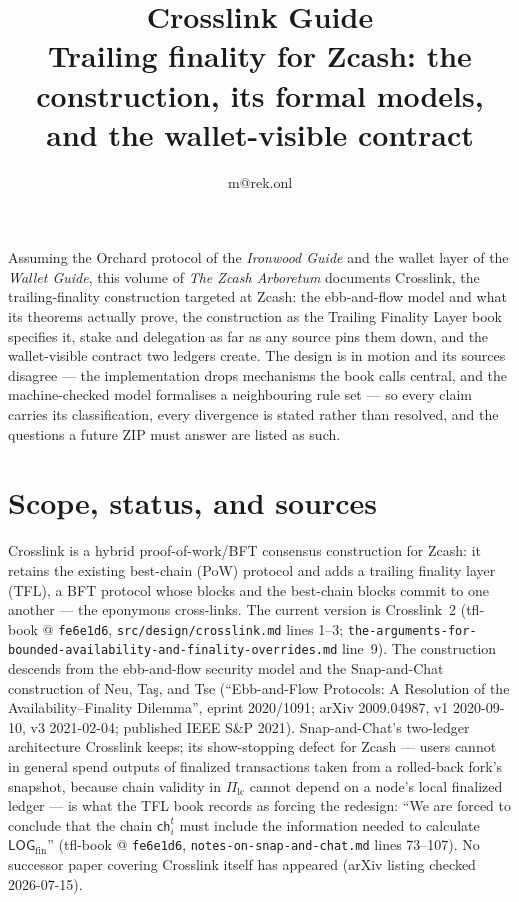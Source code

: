\documentclass[11pt,a4paper]{article}
\title{\textbf{\Huge Crosslink Guide}\\[6pt]\large Trailing finality for Zcash: the construction, its formal models, and the wallet-visible contract}
\author{m@rek.onl}
\date{}
\theoremstyle{definition}
\renewenvironment{abstract}{%
  \small\begin{center}{\bfseries\abstractname}\end{center}\medskip\noindent\ignorespaces
}{\par\medskip}
\begin{document}
\maketitle
\thispagestyle{empty}
\begin{abstract}
Assuming the Orchard protocol of the \emph{Ironwood Guide} and the wallet layer
of the \emph{Wallet Guide}, this volume of \emph{The Zcash Arboretum}
documents Crosslink, the trailing-finality construction targeted at Zcash:
the ebb-and-flow model and what its theorems actually prove, the construction
as the Trailing Finality Layer book specifies it, stake and delegation as far
as any source pins them down, and the wallet-visible contract two ledgers
create. The design is in motion and its sources disagree --- the
implementation drops mechanisms the book calls central, and the
machine-checked model formalises a neighbouring rule set --- so every claim
carries its classification, every divergence is stated rather than resolved,
and the questions a future ZIP must answer are listed as such.
\end{abstract}
\clearpage
\tableofcontents
\clearpage
\section{Scope, status, and sources}\label{sec:xl-scope}

Crosslink is a hybrid proof-of-work/BFT consensus construction for Zcash:
it retains the existing best-chain (PoW) protocol and adds a trailing
finality layer (TFL), a BFT protocol whose blocks and the best-chain
blocks commit to one another --- the eponymous cross-links. The current
version is Crosslink~2 (tfl-book @ \texttt{fe6e1d6},
\texttt{src/design/crosslink.md} lines 1--3;
\texttt{the-arguments-for-bounded-availability-and-finality-overrides.md}
line~9). The construction descends from the ebb-and-flow security model
and the Snap-and-Chat construction of Neu, Ta\c{s}, and Tse
(``Ebb-and-Flow Protocols: A Resolution of the Availability--Finality
Dilemma'', eprint 2020/1091; arXiv 2009.04987, v1 2020-09-10, v3
2021-02-04; published IEEE S\&P 2021). Snap-and-Chat's two-ledger
architecture Crosslink keeps; its show-stopping defect for Zcash ---
users cannot in general spend outputs of finalized transactions taken
from a rolled-back fork's snapshot, because chain validity in
$\Pi_{\mathrm{lc}}$ cannot depend on a node's local finalized ledger
--- is what the TFL book records as forcing the redesign: ``We are
forced to conclude that the chain $\mathsf{ch}_i^t$ must include the
information needed to calculate $\mathsf{LOG}_{\mathrm{fin}}$''
(tfl-book @ \texttt{fe6e1d6}, \texttt{notes-on-snap-and-chat.md} lines
73--107). No successor paper covering Crosslink itself has appeared
(arXiv listing checked 2026-07-15).
\end{document}

